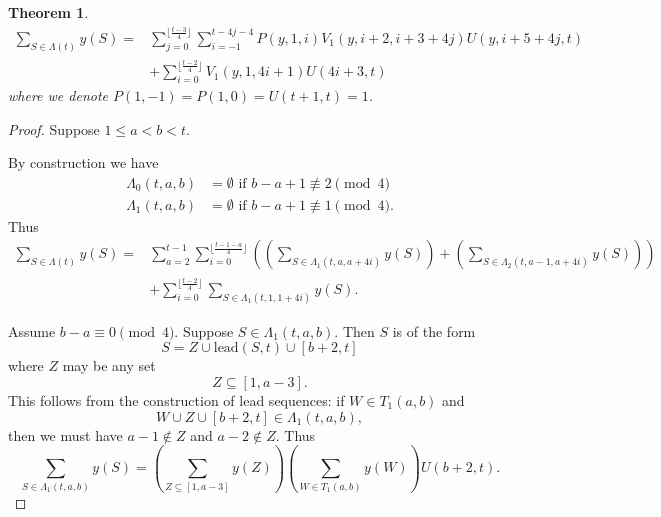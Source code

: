 \documentclass[11pt, oneside]{article}   	%
\newtheorem{theorem}{Theorem}
\begin{document}
\begin{theorem} \label{t 1 2 sum}
\begin{align}
\sum_{S \in \Lambda(t)} y(S)=& \sum_{j=0}^{\lfloor \frac{t-3}{4}\rfloor}\sum_{i =-1}^{t-4j-4}P(y,1,i) V_1(y,i+2,i+3+4j) U(y,i+5+4j,t) \label{l 2 sum}\\
& + \sum_{i=0}^{\lfloor \frac{t-2}{4}\rfloor} V_1(y,1,4i+1) U(4i+3, t) \label{l 1 sum}
\end{align}
where we denote $P(1,-1) = P(1,0) = U(t+1,t) = 1$. 
\end{theorem}
\begin{proof} 


Suppose $1 \leq a < b <t$. 

By construction we have
\begin{align*}
\Lambda_0(t,a,b) &= \emptyset \text{ if } b-a+1 \not\equiv 2 \pmod 4 \\ 
 \Lambda_1(t,a,b) &= \emptyset \text{ if } b-a+1 \not\equiv 1 \pmod 4. 
\end{align*}
Thus 
\begin{align}
\sum_{S \in \Lambda(t)} y(S) =& \sum_{a=2}^{t-1} \sum_{i=0}^{\lfloor \frac{t-1-a}{4} \rfloor}((\sum_{S \in \Lambda_1(t,a,a+4i)} y(S))+ (\sum_{S \in \Lambda_2(t,a-1,a+4i)} y(S)))\label{2 sum}\\ 
&+ \sum_{i=0}^{\lfloor \frac{t-2}{4} \rfloor}\sum_{S \in \Lambda_1(t,1,1+4i)} y(S). \label{1 sum}
\end{align}

Assume $b-a \equiv 0 \pmod 4$. Suppose $S \in \Lambda_1(t,a,b)$. Then $S$ is of the form 
\[
S = Z \cup \mathrm{lead}(S,t) \cup [b+2,t]
\]
where $Z$ may be any set 
\[
Z \subseteq [1,a-3].
\]
This follows from the construction of lead sequences: if $W \in T_1(a,b)$ and \[W\cup Z \cup [b+2,t] \in \Lambda_1(t,a,b),\] then we must have $a-1 \notin Z$ and $a-2 \notin Z$. 
Thus
\begin{equation} \label{SZ1}
\sum_{S \in \Lambda_1(t,a,b)} y(S) = \left(\sum_{Z \subseteq [1,a-3]} y(Z) \right )\left (\sum_{W \in T_1(a,b)} y(W) \right ) U(b+2, t) .
\end{equation}


\end{proof}
\end{document}

